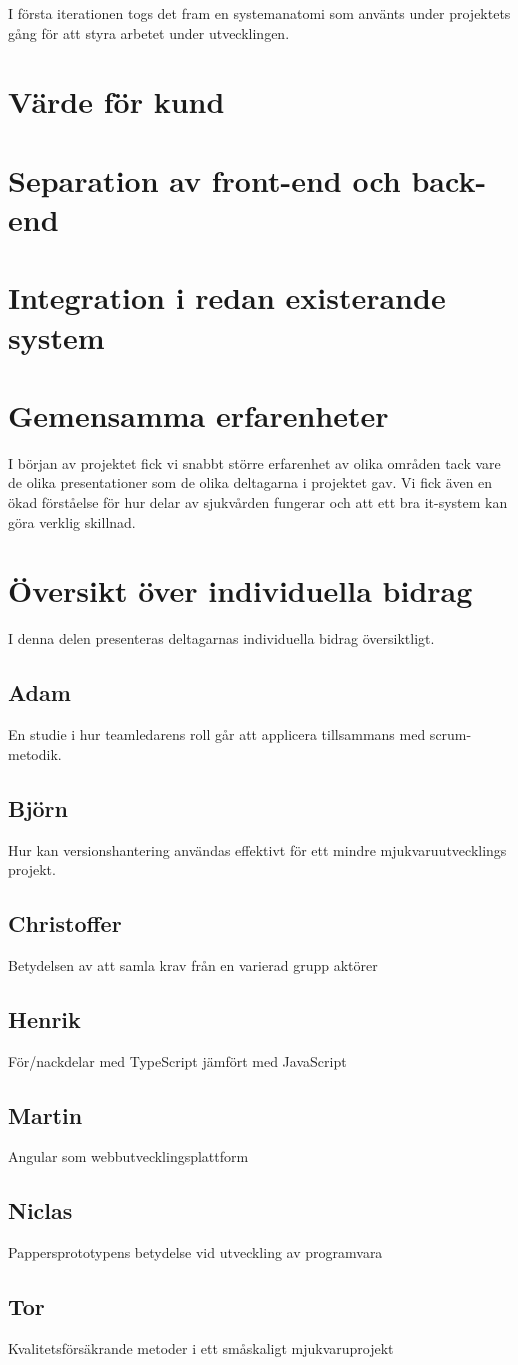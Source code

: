 I första iterationen togs det fram en systemanatomi som använts under
projektets gång för att styra arbetet under utvecklingen.

\section{Värde för kund}

\section{Separation av front-end och back-end}

\section{Integration i redan existerande system}

\section{Gemensamma erfarenheter}
I början av projektet fick vi snabbt större erfarenhet av olika områden
tack vare de olika presentationer som de olika deltagarna i projektet gav.
Vi fick även en ökad förståelse för hur delar av sjukvården fungerar och att ett bra
it-system kan göra verklig skillnad.

\section{Översikt över individuella bidrag}
I denna delen presenteras deltagarnas individuella bidrag översiktligt.

\subsection{Adam}
En studie i hur teamledarens roll går att applicera tillsammans med scrum-metodik.
\subsection{Björn}
Hur kan versionshantering användas effektivt för ett mindre mjukvaruutvecklings projekt.
\subsection{Christoffer}
Betydelsen av att samla krav från en varierad grupp aktörer
\subsection{Henrik}
För/nackdelar med TypeScript jämfört med JavaScript
\subsection{Martin}
Angular som webbutvecklingsplattform
\subsection{Niclas}
Pappersprototypens betydelse vid utveckling av programvara
\subsection{Tor}
Kvalitetsförsäkrande metoder i ett småskaligt mjukvaruprojekt